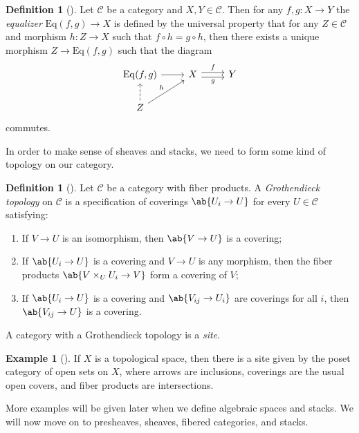 \documentclass{amsart}
\theoremstyle{definition}
\newtheorem{defn}[thm]{Definition}
\newtheorem{exm}[thm]{Example}
\theoremstyle{remark}
\theoremstyle{plain}
\theoremstyle{definition}
\theoremstyle{remark}
\newcommand{\mc}[1]{\mathcal{#1}}
\newcommand{\mr}[1]{\mathrm{#1}}
\newcommand{\1}{\mathbf{1}}
\newcommand{\2}{\mathbf{2}}
\newcommand{\3}{\mathbf{3}}
\begin{document}
\begin{defn}[{\cite[\href{https://stacks.math.columbia.edu/tag/0027}{Tag 0027}]{stacks}}]
    Let $\mc{C}$ be a category and $X,Y \in \mc{C}$. Then for any $f,g \colon X \to Y$ the \textit{equalizer} $\mr{Eq}(f,g) \to X$ is defined by the universal property that for any $Z \in \mc{C}$ and morphism $h \colon Z \to X$ such that $f \circ h = g \circ h$, then there exists a unique morphism $Z \to \mr{Eq}(f,g)$ such that the diagram
    \begin{equation*}
    \begin{tikzcd}
        \mr{Eq}(f,g) \ar{r} & X \ar[shift left=1]{r}{f} \ar[shift right=1,swap]{r}{g} & Y \\
        Z \ar[dashrightarrow]{u} \ar{ur}{h}
    \end{tikzcd}
    \end{equation*}
    commutes.
\end{defn}


In order to make sense of sheaves and stacks, we need to form some kind of topology on our category.
\begin{defn}[{\cite[Definition 1.2.1]{fganotes}}]
    Let $\mc{C}$ be a category with fiber products. A \textit{Grothendieck topology} on $\mc{C}$ is a specification of coverings $\ab\{U_i \to U\}$ for every $U \in \mc{C}$ satisfying:
    \begin{enumerate}
        \item If $V \to U$ is an isomorphism, then $\ab\{V \to U\}$ is a covering;
        \item If $\ab\{U_i \to U\}$ is a covering and $V \to U$ is any morphism, then the fiber products $\ab\{V \times_U U_i \to V\}$ form a covering of $V$;
        \item If $\ab\{U_i \to U\}$ is a covering and $\ab\{V_{ij} \to U_i\}$ are coverings for all $i$, then $\ab\{V_{ij} \to U\}$ is a covering.
    \end{enumerate}
    A category with a Grothendieck topology is a \textit{site}.
\end{defn}

\begin{exm}[{\cite[Example 1.2.2]{fganotes}}]
    If $X$ is a topological space, then there is a site given by the poset category of open sets on $X$, where arrows are inclusions, coverings are the usual open covers, and fiber products are intersections.
\end{exm}

More examples will be given later when we define algebraic spaces and stacks. We will now move on to presheaves, sheaves, fibered categories, and stacks.
\end{document}
